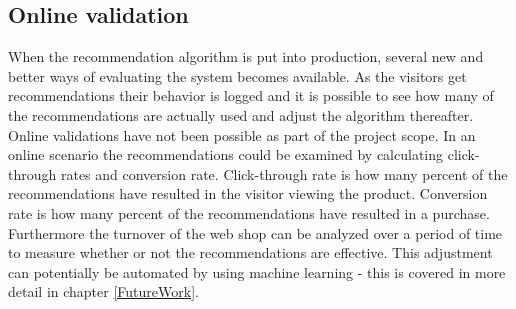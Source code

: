 \subsection{Online validation}
When the recommendation algorithm is put into production, several new and better ways of evaluating the system becomes available. As the visitors get recommendations their behavior is logged and it is possible to see how many of the recommendations are actually used and adjust the algorithm thereafter. Online validations have not been possible as part of the project scope. In an online scenario the recommendations could be examined by calculating click-through rates and conversion rate. Click-through rate is how many percent of the recommendations have resulted in the visitor viewing the product. Conversion rate is how many percent of the recommendations have resulted in a purchase. Furthermore the turnover of the web shop can be analyzed over a period of time to measure whether or not the recommendations are effective.
This adjustment can potentially be automated by using machine learning - this is covered in more detail in chapter \ref{FutureWork}.

 
